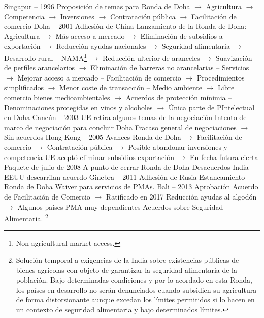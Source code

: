 \documentclass{nuevotema}
\begin{document}
\begin{esquemal}
				\4 Singapur -- 1996
				\4[] Proposición de temas para Ronda de Doha
				\4[] $\to$ Agricultura
				\4[] $\to$ Competencia
				\4[] $\to$ Inversiones
				\4[] $\to$ Contratación pública
				\4[] $\to$ Facilitación de comercio
				\4 Doha -- 2001
				\4[] Adhesión de China
				\4[] Lanzamiento de la Ronda de Doha:
				\4[] -- Agricultura
				\4[] $\to$ Más acceso a mercado
				\4[] $\to$ Eliminación de subsidios a exportación
				\4[] $\to$ Reducción ayudas nacionales
				\4[] $\to$ Seguridad alimentaria
				\4[] $\to$ Desarrollo rural
				\4[] -- NAMA\footnote{Non-agricultural market access.}
				\4[] $\to$ Reducción ulterior de aranceles
				\4[] $\to$ Suavización de perfiles arancelarios
				\4[] $\to$ Eliminación de barreras no arancelarias
				\4[] -- Servicios
				\4[] $\to$ Mejorar acceso a mercado
				\4[] -- Facilitación de comercio
				\4[] $\to$ Procedimientos simplificados
				\4[] $\to$ Menor coste de transacción
				\4[] -- Medio ambiente
				\4[] $\to$ Libre comercio bienes medioambientales
				\4[] $\to$ Acuerdos de protección mínimia
				\4[] -- Denominaciones protegidas en vinos y alcoholes
				\4[] $\to$ Única parte de PIntelectual en Doha
				\4 Cancún -- 2003
				\4[] UE retira algunos temas de la negociación
				\4[] Intento de marco de negociación para concluir Doha
				\4[] Fracaso general de negociaciones
				\4[] $\to$ Sin acuerdos
				\4 Hong Kong -- 2005
				\4[] Avances Ronda de Doha
				\4[] $\to$ Facilitación de comercio
				\4[] $\to$ Contratación pública
				\4[] $\to$ Posible abandonar inversiones y competencia
				\4[] UE aceptó eliminar subsidios exportación
				\4[] $\to$ En fecha futura cierta
				\4 Paquete de julio de 2008
				\4[] A punto de cerrar Ronda de Doha
				\4[] Desacuerdos India--EEUU descarrilan acuerdo
				\4 Ginebra -- 2011
				\4[] Adhesión de Rusia
				\4[] Estancamiento Ronda de Doha
				\4[] Waiver para servicios de PMAs.
				\4 Bali -- 2013
				\4[] Aprobación Acuerdo de Facilitación de Comercio
				\4[] $\to$ Ratificado en 2017
				\4[] Reducción ayudas al algodón
				\4[] $\to$ Algunos países PMA muy dependientes
				\4[] Acuerdos sobre Seguridad Alimentaria. \footnote{Solución temporal a exigencias de la India sobre existencias públicas de bienes agrícolas con objeto de garantizar la seguridad alimentaria de la población. Bajo determinadas condiciones y por lo acordado en esta Ronda, los países en desarrollo no serán denunciados cuando subsidien su agricultura de forma distorsionante aunque excedan los límites permitidos si lo hacen en un contexto de seguridad alimentaria y bajo determinados límites.}

\end{esquemal}
\end{document}

